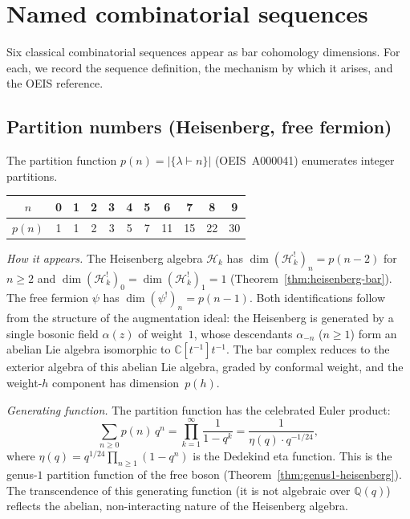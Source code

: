 \section{Named combinatorial sequences}
\label{sec:named-sequences}

Six classical combinatorial sequences appear as bar cohomology dimensions.  For each, we record the sequence definition, the mechanism by which it arises, and the OEIS reference.

\subsection{Partition numbers (Heisenberg, free fermion)}
\label{subsec:partition-numbers}

The partition function $p(n) = |\{\lambda \vdash n\}|$ (OEIS~A000041) enumerates integer partitions.

\begin{center}
\renewcommand{\arraystretch}{1.2}
\begin{tabular}{c|cccccccccc}
$n$ & 0 & 1 & 2 & 3 & 4 & 5 & 6 & 7 & 8 & 9 \\
\hline
$p(n)$ & 1 & 1 & 2 & 3 & 5 & 7 & 11 & 15 & 22 & 30
\end{tabular}
\end{center}

\emph{How it appears.}
The Heisenberg algebra $\mathcal{H}_k$ has $\dim(\mathcal{H}_k^!)_n = p(n-2)$ for $n \geq 2$ and $\dim(\mathcal{H}_k^!)_0 = \dim(\mathcal{H}_k^!)_1 = 1$ (Theorem~\ref{thm:heisenberg-bar}).  The free fermion $\psi$ has $\dim(\psi^!)_n = p(n-1)$.  Both identifications follow from the structure of the augmentation ideal: the Heisenberg is generated by a single bosonic field $\alpha(z)$ of weight~$1$, whose descendants $\alpha_{-n}$ ($n \geq 1$) form an abelian Lie algebra isomorphic to $\mathbb{C}[t^{-1}]t^{-1}$.  The bar complex reduces to the exterior algebra of this abelian Lie algebra, graded by conformal weight, and the weight-$h$ component has dimension~$p(h)$.

\emph{Generating function.}
The partition function has the celebrated Euler product:
\[
\sum_{n \geq 0} p(n)\, q^n = \prod_{k=1}^{\infty} \frac{1}{1 - q^k}
= \frac{1}{\eta(q) \cdot q^{-1/24}},
\]
where $\eta(q) = q^{1/24}\prod_{n \geq 1}(1-q^n)$ is the Dedekind eta function.  This is the genus-$1$ partition function of the free boson (Theorem~\ref{thm:genus1-heisenberg}).  The transcendence of this generating function (it is not algebraic over $\mathbb{Q}(q)$) reflects the abelian, non-interacting nature of the Heisenberg algebra.

